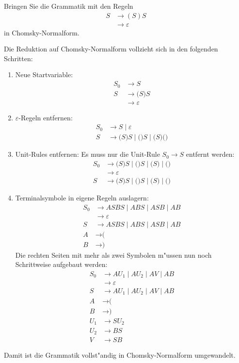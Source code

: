 Bringen Sie die Grammatik mit den Regeln
\begin{align*}
S&\rightarrow (S)S
\\
 &\rightarrow \varepsilon
\end{align*}
in Chomsky-Normalform.

\begin{loesung}
Die Reduktion auf Chomsky-Normalform vollzieht sich in den folgenden Schritten:
\begin{enumerate}
\item
Neue Startvariable:
\begin{align*}
S_0&\rightarrow S
\\
S&\rightarrow \texttt{(}S\texttt{)}S
\\
 &\rightarrow \varepsilon
\end{align*}
\item
$\varepsilon$-Regeln entfernen:
\begin{align*}
S_0&\rightarrow S \;|\; \varepsilon
\\
S&\rightarrow \texttt{(}S\texttt{)}S \;|\; \texttt{(}\texttt{)}S \;|\;
  \texttt{(}S\texttt{)} \texttt{(}\texttt{)}
\end{align*}
\item
Unit-Rules entfernen: Es muss nur die Unit-Rule $S_0\to S$ entfernt
werden:
\begin{align*}
S_0& \rightarrow \texttt{(}S)S \;|\; \texttt{(})S \;|\; \texttt{(}S) \;|\;
	\texttt{(})
\\
   &\rightarrow \varepsilon
\\
S&\rightarrow \texttt{(}S\texttt{)}S \;|\; \texttt{(}\texttt{)}S \;|\;
	\texttt{(}S\texttt{)} \;|\; \texttt{(}\texttt{)}
\end{align*}
\item Terminalsymbole in eigene Regeln auslagern:
\begin{align*}
S_0& \rightarrow ASBS \;|\; ABS \;|\; ASB \;|\; AB
\\
   &\rightarrow \varepsilon
\\
S&\rightarrow ASBS \;|\; ABS \;|\; ASB \;|\; AB
\\
A&\rightarrow \texttt{(}
\\
B&\rightarrow \texttt{)}
\end{align*}
Die rechten Seiten mit mehr als zwei Symbolen m"ussen nun noch Schrittweise
aufgebaut werden:
\begin{align*}
S_0& \rightarrow AU_1 \;|\; AU_2 \;|\; AV \;|\; AB
\\
   &\rightarrow \varepsilon
\\
S&\rightarrow AU_1 \;|\; AU_2 \;|\; AV \;|\; AB
\\
A&\rightarrow \texttt{(}
\\
B&\rightarrow \texttt{)}
\\
U_1&\rightarrow SU_2\\
U_2&\rightarrow BS\\
V  &\rightarrow SB
\end{align*}
\end{enumerate}
Damit ist die Grammatik vollst"andig in Chomsky-Normalform umgewandelt.
\end{loesung}

\begin{bewertung}
\end{bewertung}

